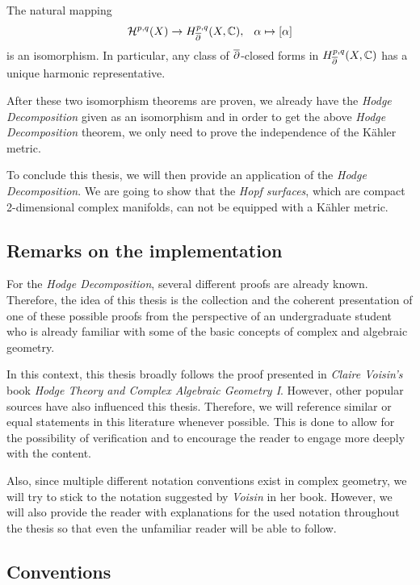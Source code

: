\begin{thm}
	The natural mapping
	\begin{align*}
		\mathcal{H}^{p,q}(X) \rightarrow H^{p,q}_{\overline{\partial}}(X,\mathbb{C}),\; \enspace \alpha \mapsto
		[\alpha]
	\end{align*}
	is an isomorphism. In particular, any class of ${\overline{\partial}}$-closed forms in
	$H^{p,q}_{\overline{\partial}}(X,\mathbb{C})$
	has a unique harmonic representative.
\end{thm}
After these two isomorphism theorems are proven, we already have the \emph{Hodge Decomposition}
given as an isomorphism and in order to get the above \emph{Hodge Decomposition} theorem, we only
need to prove the independence of the Kähler metric.

To conclude this thesis, we will then provide an application of the \emph{Hodge Decomposition}. We
are going to show that the \emph{Hopf surfaces}, which are compact 2-dimensional complex manifolds,
can not be equipped with a Kähler metric.

\subsection*{Remarks on the implementation}\;

For the \emph{Hodge Decomposition}, several different proofs are already known. Therefore, the idea
of this thesis is the collection and the coherent presentation of one of these possible proofs from
the perspective of an undergraduate student who is already familiar with some of the basic concepts
of complex and algebraic geometry.

In this context, this thesis broadly follows the proof presented in \emph{Claire Voisin's} book
\emph{Hodge Theory and Complex Algebraic Geometry I}. However, other popular sources have also
influenced this thesis. Therefore, we will reference similar or equal statements in this literature
whenever possible. This is done to allow for the possibility of verification and to encourage the
reader to engage more deeply with the content.

Also, since multiple different notation conventions exist in complex geometry, we will try to stick
to the notation suggested by \emph{Voisin} in her book. However, we will also provide the reader
with explanations for the used notation throughout the thesis so that even the unfamiliar reader
will be able to follow.

\subsection*{Conventions}\;


